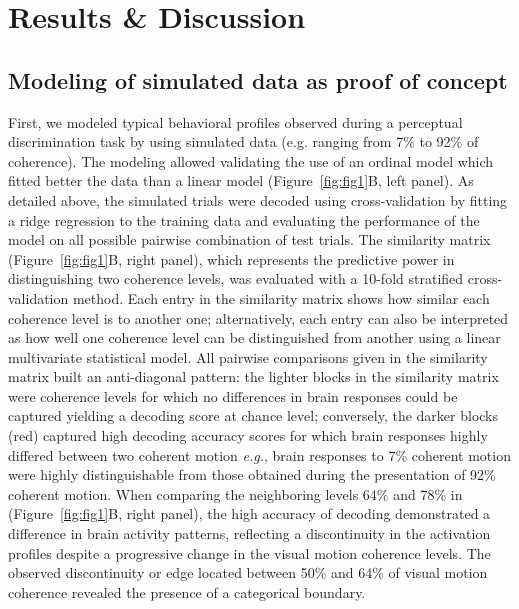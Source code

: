 \section{Results \& Discussion}
\subsection*{Modeling of simulated data as proof of concept}

First, we modeled typical behavioral profiles observed during a perceptual discrimination task by using simulated data (e.g. ranging from 7\% to 92\% of coherence). The modeling allowed validating the use of an ordinal model which fitted better the data than a linear model (Figure~\ref{fig:fig1}B, left panel). As detailed above, the simulated trials were decoded using cross-validation by fitting a ridge regression to the training data and evaluating the performance of the model on all possible pairwise combination of test trials.
The similarity matrix (Figure~\ref{fig:fig1}B, right panel), which represents the predictive power in distinguishing two coherence levels, was evaluated with a 10-fold stratified cross-validation method. Each entry in the similarity matrix shows how similar each coherence level is to another one; alternatively, each entry can also be interpreted as how well one coherence level can be distinguished from another using a linear multivariate statistical model. All pairwise comparisons given in the similarity matrix built an anti-diagonal pattern: the lighter blocks in the similarity matrix were coherence levels for which no differences in brain responses could be captured yielding a decoding score at chance level; conversely, the darker blocks (red) captured high decoding accuracy scores for which brain responses highly differed between two coherent motion \textit{e.g.}, brain responses to 7\% coherent motion were highly distinguishable from those obtained during the presentation of 92\% coherent motion. When comparing the neighboring levels 64\% and 78\% in (Figure~\ref{fig:fig1}B, right panel), the high accuracy of decoding demonstrated a difference in brain activity patterns, reflecting a discontinuity in the activation profiles despite a progressive change in the visual motion coherence levels. The observed discontinuity or edge located between 50\% and 64\% of visual motion coherence revealed the presence of a categorical boundary.\\

